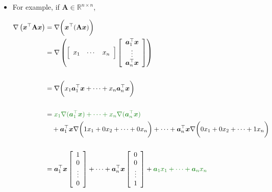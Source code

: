 \documentclass[12pt,thmsa]{article}
\begin{document}
\newpage
\begin{itemize}
	\item For example, 	if \(\mathbf{A} \in \mathbb{R}^{n \times n}\),
	
	\[ \begin{aligned}    
		\nabla \left(\boldsymbol{x}^{\top} \mathbf{A} \boldsymbol{x}\right)    
		&=\nabla \bigg( \boldsymbol{x}^{\top}( {\color{black}{\mathbf{A} \boldsymbol{x}}} ) \bigg) \\ 
		&=\nabla \left(
		\boldsymbol{\Big[} \begin{array}{ccc}
			x_{1} & \cdots & x_{n}
		\end{array}
		\boldsymbol{\Big]}
		\left[ \begin{array}{c}
			\boldsymbol{a}_{1}^{\top}\boldsymbol{x} \\ \vdots \\ \boldsymbol{a}_{n}^{\top}\boldsymbol{x}
		\end{array}
		\right]
		\right)
		\\
		& \\
		&=\nabla \bigg( x_{1}\boldsymbol{a}_{1}^{\top}\boldsymbol{x} + \cdots + x_{n}\boldsymbol{a}_{n}^{\top}\boldsymbol{x} \bigg) \\
		& \\
		&= {\color{forestgreen} x_{1} \nabla (\boldsymbol{a}_{1}^{\top}\boldsymbol{x}) + \cdots + x_{n} \nabla (\boldsymbol{a}_{n}^{\top}\boldsymbol{x})} \\
		& \quad + \boldsymbol{a}_{1}^{\top}\boldsymbol{x} \nabla \bigg(1x_{1}+0x_{2}+ \cdots+ 0x_{n}\bigg) + \cdots +  \boldsymbol{a}_{n}^{\top}\boldsymbol{x} \nabla \bigg( 0x_{1}+0x_{2}+ \cdots+ 1x_{n} \bigg)\\
		& \\
		&= \boldsymbol{a}_{1}^{\top}\boldsymbol{x} \left[ \begin{array}{c} 1 \\ 0 \\ \vdots \\ 0 \end{array}\right] + \cdots + \boldsymbol{a}_{n}^{\top}\boldsymbol{x} \left[ \begin{array}{c} 0 \\ 0 \\ \vdots \\ 1 \end{array}\right]
		+ {\color{forestgreen} \boldsymbol{a}_{1} x_{1} + \cdots + \boldsymbol{a}_{n} x_{n}}
		\\
		& \\

\end{aligned}\]
\end{itemize}
\end{document}
